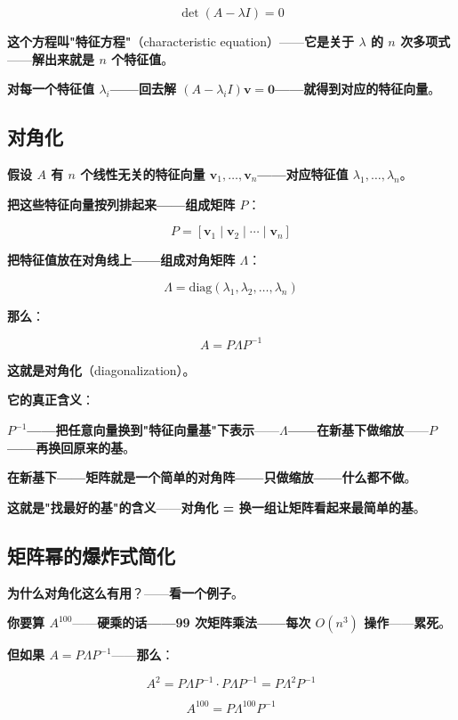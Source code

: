 \[
\boxed{\det(A - \lambda I) = 0}
\]

\textbf{这个方程叫"特征方程"}（characteristic equation）——\textbf{它是关于 $\lambda$ 的 $n$ 次多项式}——\textbf{解出来就是 $n$ 个特征值}。

\textbf{对每一个特征值 $\lambda_i$——回去解 $(A - \lambda_i I)\bm{v} = \bm{0}$——就得到对应的特征向量}。

\subsection{对角化}

\textbf{假设 $A$ 有 $n$ 个线性无关的特征向量 $\bm{v}_1, \dots, \bm{v}_n$——对应特征值 $\lambda_1, \dots, \lambda_n$}。

\textbf{把这些特征向量按列排起来——组成矩阵 $P$}：

\[
P = [\bm{v}_1 \;|\; \bm{v}_2 \;|\; \cdots \;|\; \bm{v}_n]
\]

\textbf{把特征值放在对角线上——组成对角矩阵 $\Lambda$}：

\[
\Lambda = \mathrm{diag}(\lambda_1, \lambda_2, \dots, \lambda_n)
\]

\textbf{那么}：

\[
\boxed{A = P \Lambda P^{-1}}
\]

\textbf{这就是对角化}（diagonalization）。

\textbf{它的真正含义}：

\textbf{$P^{-1}$——把任意向量换到"特征向量基"下表示}——\textbf{$\Lambda$——在新基下做缩放}——\textbf{$P$——再换回原来的基}。

\textbf{在新基下——矩阵就是一个简单的对角阵——只做缩放——什么都不做}。

\textbf{这就是"找最好的基"的含义}——\textbf{对角化 = 换一组让矩阵看起来最简单的基}。

\subsection{矩阵幂的爆炸式简化}

\textbf{为什么对角化这么有用}？——\textbf{看一个例子}。

\textbf{你要算 $A^{100}$}——\textbf{硬乘的话——99 次矩阵乘法——每次 $O(n^3)$ 操作}——\textbf{累死}。

\textbf{但如果 $A = P\Lambda P^{-1}$}——\textbf{那么}：

\[
A^2 = P\Lambda P^{-1} \cdot P\Lambda P^{-1} = P \Lambda^2 P^{-1}
\]

\[
A^{100} = P \Lambda^{100} P^{-1}
\]

